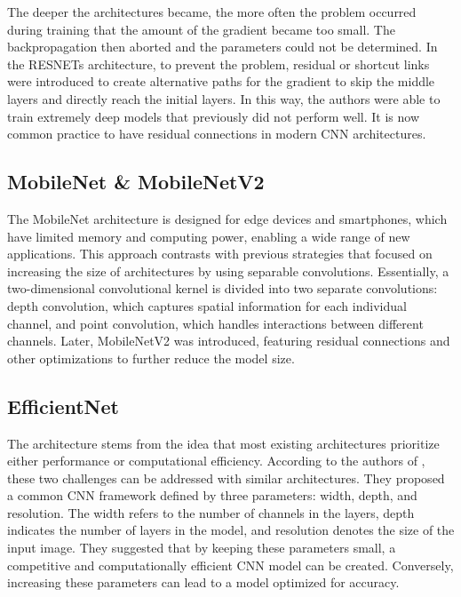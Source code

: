 {	The deeper the architectures became, the more often the problem occurred during training that the amount of the gradient became too small. The backpropagation then aborted and the parameters could not be determined. In the RESNETs architecture, to prevent the problem, residual or shortcut links were introduced to create alternative paths for the gradient to skip the middle layers and directly reach the initial layers. In this way, the authors were able to train extremely deep models that previously did not perform well. It is now common practice to have residual connections in modern CNN architectures. \cite{He:2016}
	
	
	
	
	\subsection*{MobileNet \& MobileNetV2} 
	
	The MobileNet architecture is designed for edge devices and smartphones, which have limited memory and computing power, enabling a wide range of new applications. This approach contrasts with previous strategies that focused on increasing the size of architectures by using separable convolutions. Essentially, a two-dimensional convolutional kernel is divided into two separate convolutions: depth convolution, which captures spatial information for each individual channel, and point convolution, which handles interactions between different channels. Later, MobileNetV2 was introduced, featuring residual connections and other optimizations to further reduce the model size. \cite{Howard:2017,MobileNet:2018}
	
	\subsection*{EfficientNet} 
	The architecture stems from the idea that most existing architectures prioritize either performance or computational efficiency. According to the authors of \cite{Tan:2020}, these two challenges can be addressed with similar architectures. They proposed a common CNN framework defined by three parameters: width, depth, and resolution. The width refers to the number of channels in the layers, depth indicates the number of layers in the model, and resolution denotes the size of the input image. They suggested that by keeping these parameters small, a competitive and computationally efficient CNN model can be created. Conversely, increasing these parameters can lead to a model optimized for accuracy.
	
}

